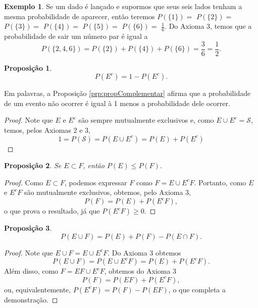 \documentclass[]{book}
\newtheorem{proposition}{Proposição}[chapter]
\theoremstyle{definition}
\theoremstyle{definition}
\newtheorem{example}{Exemplo}[chapter]
\theoremstyle{definition}
\theoremstyle{remark}
\begin{document}
\begin{example}
\protect\hypertarget{exm:unnamed-chunk-122}{}{\label{exm:unnamed-chunk-122} }Se um dado é lançado e supormos que seus seis lados tenham a mesma probabilidade de aparecer, então teremos \(P(\{1\})=\) \(P(\{2\})=\) \(P(\{3\})=\) \(P(\{4\})=\) \(P(\{5\})=\) \(P(\{6\})=\) \(\frac{1}{6}\).
Do Axioma 3, temos que a probabilidade de sair um número par é igual a
\[P(\{2,4,6\}) = P(\{ 2 \})+P(\{ 4 \})+P(\{ 6 \}) = \frac{3}{6} = \frac{1}{2}.\]
\end{example}

\begin{proposition}
\protect\hypertarget{prp:propComplementar}{}{\label{prp:propComplementar} }\[P(E^c) = 1 - P(E^c).\]
\end{proposition}

Em palavras, a Proposição \ref{prp:propComplementar} afirma que a probabilidade de um evento não ocorrer é igual à 1 menos a probabilidade dele ocorrer.

\begin{proof}
\iffalse{} {Prova. } \fi{}Note que \(E\) e \(E^c\) são sempre mutualmente exclusivos e, como \(E\cup E^c=\mathcal{S}\), temos, pelos Axiomas 2 e 3,
\[1 = P(\mathcal{S}) = P(E\cup E^c) = P(E) + P(E^c)\]
\end{proof}

\begin{proposition}
\protect\hypertarget{prp:propProbSubConjunto}{}{\label{prp:propProbSubConjunto} }Se \(E \subset F\), então \(P(E) \leq P(F)\).
\end{proposition}

\begin{proof}
\iffalse{} {Prova. } \fi{}Como \(E \subset F\), podemos expressar \(F\) como \(F = E \cup E^c F\).
Portanto, como \(E\) e \(E^c F\) são mutualmente exclusivos, obtemos, pelo Axioma 3,
\[P(F) = P(E) + P(E^c F),\]
o que prova o resultado, já que \(P( E^c F)\geq 0\).
\end{proof}

\begin{proposition}
\protect\hypertarget{prp:propProbUniao}{}{\label{prp:propProbUniao} }\[P(E \cup F) = P(E) + P(F) - P(E\cap F).\]
\end{proposition}

\begin{proof}
\iffalse{} {Prova. } \fi{}Note que \(E \cup F = E \cup E^c F\).
Do Axioma 3 obtemos
\[P(E \cup F) = P(E \cup E^c F) = P(E) + P(E^c F).\]
Além disso, como \(F = EF\cup E^c F\), obtemos do Axioma 3
\[P(F) = P(EF) + P(E^c F),\]
ou, equivalentemente, \(P(E^c F) = P(F) - P(EF)\), o que completa a demonstração.
\end{proof}
\end{document}
